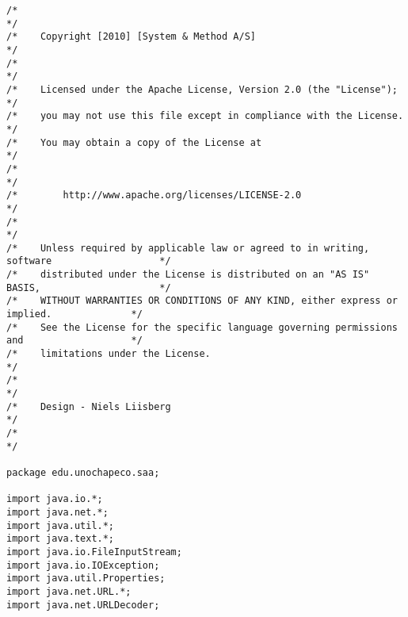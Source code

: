 \begin{lstlisting}
/*                                                                                          */
/*    Copyright [2010] [System & Method A/S]                                                */
/*                                                                                          */
/*    Licensed under the Apache License, Version 2.0 (the "License");                       */
/*    you may not use this file except in compliance with the License.                      */
/*    You may obtain a copy of the License at                                               */
/*                                                                                          */
/*        http://www.apache.org/licenses/LICENSE-2.0                                        */
/*                                                                                          */
/*    Unless required by applicable law or agreed to in writing, software                   */
/*    distributed under the License is distributed on an "AS IS" BASIS,                     */
/*    WITHOUT WARRANTIES OR CONDITIONS OF ANY KIND, either express or implied.              */
/*    See the License for the specific language governing permissions and                   */
/*    limitations under the License.                                                        */
/*                                                                                          */
/*    Design - Niels Liisberg                                                               */
/*                                                                                          */

package edu.unochapeco.saa;

import java.io.*;
import java.net.*;
import java.util.*;
import java.text.*;
import java.io.FileInputStream;
import java.io.IOException;
import java.util.Properties;
import java.net.URL.*;
import java.net.URLDecoder;


\end{lstlisting}
